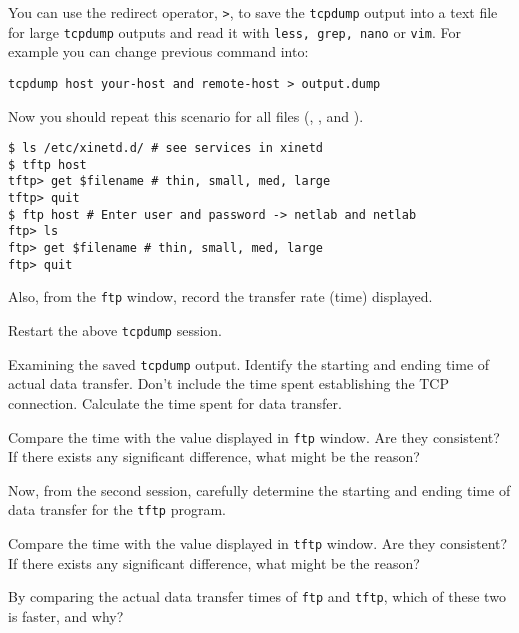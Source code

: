 \documentclass{../UTNetLab}
\begin{document}
    You can use the redirect operator, \lstinline{>}, to save the \lstinline{tcpdump} output into a text file for large \lstinline{tcpdump} outputs and read it with \lstinline{less, grep, nano} or \lstinline{vim}.
    For example you can change previous command into:
    \begin{lstlisting}[emph={your-host,remote-host,output,dump},morekeywords={[3]host,and}]
tcpdump host your-host and remote-host > output.dump
    \end{lstlisting}
    
    Now you should repeat this scenario for all files (, ,  and ).
    \begin{lstlisting}[emph={host},morekeywords={[2]get,quit}]
$ ls /etc/xinetd.d/ # see services in xinetd
$ tftp host
tftp> get $filename # thin, small, med, large
tftp> quit
$ ftp host # Enter user and password -> netlab and netlab
ftp> ls
ftp> get $filename # thin, small, med, large
ftp> quit
    \end{lstlisting}

    Also, from the \lstinline{ftp} window, record the transfer rate (time) displayed.

    Restart the above \lstinline{tcpdump} session.

    \begin{report}
        \item Examining the saved \lstinline{tcpdump} output.
            Identify the starting and ending time of actual data transfer.
            Don’t include the time spent establishing the TCP connection.
            Calculate the time spent for data transfer.

        \item Compare the time with the value displayed in \lstinline{ftp} window.
            Are they consistent?
            If there exists any significant difference, what might be the reason? 

        \item Now, from the second session, carefully determine the starting and ending time of data transfer for the \lstinline{tftp} program.

        \item Compare the time with the value displayed in \lstinline{tftp} window.
            Are they consistent?
            If there exists any significant difference, what might be the reason? 

        \item By comparing the actual data transfer times of \lstinline{ftp} and \lstinline{tftp}, which of these two is faster, and why?
    \end{report}
\end{document}
